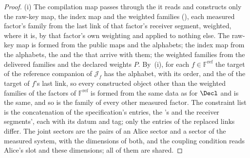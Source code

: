 \begin{proof}
(i) The compilation map passes through the  it reads and
constructs only the raw-key map, the index map and the weighted families
(), each measured factor's family from
the last link of that factor's receiver segment, weighted, where it is, by
that factor's own weighting and applied to nothing else. The raw-key map is
formed from the public maps and the alphabets; the index map from the
alphabets, the  and the  that arrive with them; the weighted families from the delivered
families and the declared weights $P$. By
\,(i), for each
$f\in\mathbb{F}^{\mathrm{ref}}$ the target of the reference companion of
$\mathcal{J}_f$ has the alphabet, with its order, and the 
of the target of $f$'s last link, so every constructed object other than the
weighted families of the factors of $\mathbb{F}^{\mathrm{ref}}$ is formed
from the same data as for $\Decl$ and is the same, and so is the family of
every other measured factor. The constraint list is the concatenation of the
specification's entries, the 's and the receiver
segments', each with its datum and tag; only the entries of the replaced
links differ. The joint sectors are the pairs of an Alice sector and a sector
of the measured system, with the dimensions of both, and the coupling
condition reads Alice's slot and these dimensions; all of them are shared.


\end{proof}
